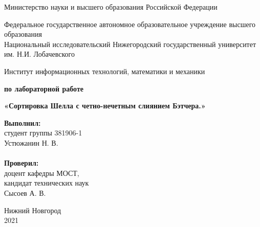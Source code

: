 \documentclass{report}
\begin{document}
\begin{titlepage}

\begin{center}
Министерство науки и высшего образования Российской Федерации
\end{center}

\begin{center}
Федеральное государственное автономное образовательное учреждение высшего образования \\
Национальный исследовательский Нижегородский государственный университет им. Н.И. Лобачевского
\end{center}

\begin{center}
Институт информационных технологий, математики и механики
\end{center}

\vspace{4em}

\begin{center}
\textbf{ по лабораторной работе} \\
\end{center}
\begin{center}
\textbf{\Large«Сортировка Шелла с четно-нечетным слиянием Бэтчера.»} \\
\end{center}

\vspace{4em}

\newbox{\lbox}
\newlength{\maxl}
\setlength{\maxl}{\wd\lbox}
\hfill\parbox{7cm}{
\hspace*{5cm}\hspace*{-5cm}\textbf{Выполнил:} \\ студент группы 381906-1 \\ Устюжанин Н. В.\\
\\
\hspace*{5cm}\hspace*{-5cm}\textbf{Проверил:}\\ доцент кафедры МОСТ, \\ кандидат технических наук \\ Сысоев А. В.\\
}
\vspace{\fill}

\begin{center} Нижний Новгород \\ 2021 \end{center}

\end{titlepage}
\end{document}
